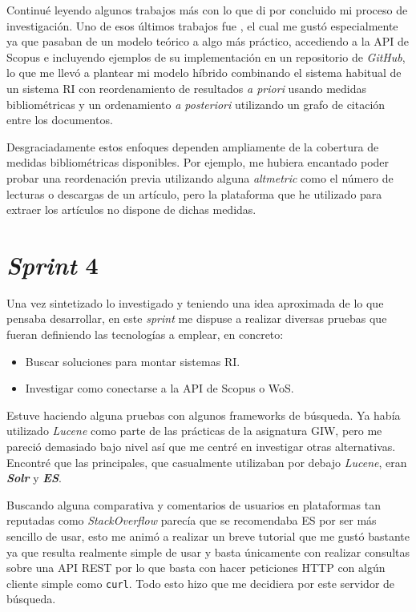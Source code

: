 Continué leyendo algunos trabajos más con lo que di por concluido mi proceso de investigación. Uno de esos últimos trabajos fue \cite{DBLP:conf/ecir/SarolLS18}, el cual me gustó especialmente ya que pasaban de un modelo teórico a algo más práctico, accediendo a la \acrshort{API} de Scopus e incluyendo ejemplos de su implementación en un repositorio de \textit{GitHub}, lo que me llevó a plantear mi modelo híbrido combinando el sistema habitual de un sistema \acrshort{RI} con reordenamiento de resultados \textit{a priori} usando medidas bibliométricas y un ordenamiento \textit{a posteriori} utilizando un grafo de citación entre los documentos.

Desgraciadamente estos enfoques dependen ampliamente de la cobertura de medidas bibliométricas disponibles. Por ejemplo, me hubiera encantado poder probar una reordenación previa utilizando alguna \textit{altmetric} como el número de lecturas o descargas de un artículo, pero la plataforma que he utilizado para extraer los artículos no dispone de dichas medidas.

\section{\textit{Sprint} 4}
\label{sc:sprint4}
Una vez sintetizado lo investigado y teniendo una idea aproximada de lo que pensaba desarrollar, en este \textit{sprint} me dispuse a realizar diversas pruebas que fueran definiendo las tecnologías a emplear, en concreto:
\begin{itemize}
	\item Buscar soluciones para montar sistemas \acrshort{RI}.
	\item Investigar como conectarse a la \acrshort{API} de Scopus o \acrshort{WoS}.
\end{itemize}

Estuve haciendo alguna pruebas con algunos \glspl{framework} de búsqueda. Ya había utilizado \textit{Lucene} como parte de las prácticas de la asignatura \acrshort{GIW}, pero me pareció demasiado bajo nivel así que me centré en investigar otras alternativas. Encontré que las principales, que casualmente utilizaban por debajo \textit{Lucene}, eran \textit{\textbf{Solr}} y \textit{\textbf{\acrfull{ES}}}.

Buscando alguna comparativa \cite{ES_Solr} y comentarios de usuarios en plataformas tan reputadas como \textit{StackOverflow} \cite{ES_Solr_SO} parecía que se recomendaba \acrshort{ES} por ser más sencillo de usar, esto me animó a realizar un breve tutorial \cite{ES_tutorial} que me gustó bastante ya que resulta realmente simple de usar y basta únicamente con realizar consultas sobre una \acrshort{API} \acrshort{REST} por lo que basta con hacer peticiones \acrshort{HTTP} con algún cliente simple como \texttt{curl}. Todo esto hizo que me decidiera por este servidor de búsqueda.


